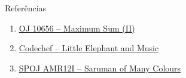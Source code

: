 \begin{frame}[fragile]{Referências}

    \begin{enumerate}
        \item \href{https://uva.onlinejudge.org/index.php?option=com_onlinejudge&Itemid=8&category=24&page=show_problem&problem=1597}{OJ 10656 -- Maximum Sum (II)} 

        \item \href{https://www.codechef.com/problems/LEMUSIC}{Codechef -- Little Elephant and Music}

        \item \href{https://www.spoj.com/problems/AMR12I/}{SPOJ AMR12I -- Saruman of Many Colours}

    \end{enumerate}

\end{frame}
